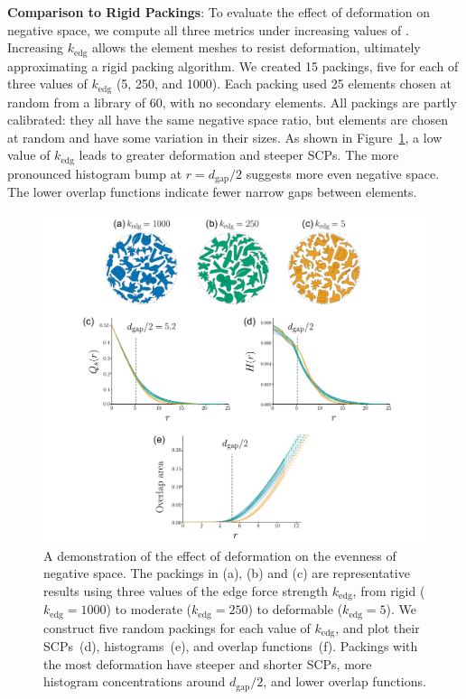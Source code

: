 \textbf{Comparison to Rigid Packings}: 
To evaluate the effect of deformation on negative space, we compute all three metrics under
increasing values of .  
Increasing $k_\mathrm{edg}$
allows the element meshes to resist deformation, ultimately
approximating a rigid packing algorithm.  We created 15 packings,
five for each of three values of $k_\mathrm{edg}$ (5, 250, and 1000).  Each packing
used 25 elements chosen at random from a library of 60, with
no secondary elements.  
All packings are partly calibrated: they all have the same negative
space ratio, but elements are chosen at random and have some
variation in their sizes.
As shown in Figure~\ref{fifteen_packings}, a low value of
$k_\mathrm{edg}$ leads to greater deformation and steeper SCPs.
The more pronounced histogram bump at $r=d_\mathrm{gap}/2$ suggests
more even negative space.
The lower overlap functions indicate fewer narrow gaps between elements.

\begin{figure}
\centering
\includegraphics[width=1.0\textwidth]{figures/metrics/evaluation_big.pdf}
\caption[A demonstration of the effect of deformation \newline on the evenness of negative space]
{\label{fifteen_packings}
A demonstration of the effect of deformation on the evenness of negative space.  
The packings in (a), (b) and (c) are representative results using three values of the edge force strength $k_\mathrm{edg}$,
from rigid ($k_\mathrm{edg}=1000$) to moderate ($k_\mathrm{edg}=250$) to deformable ($k_\mathrm{edg}=5$).
We construct five random packings for each value of $k_\mathrm{edg}$, and plot their SCPs~(d), histograms~(e), and overlap functions~(f).
Packings with the most deformation have steeper and shorter SCPs, 
more histogram concentrations around $d_\mathrm{gap} / 2$, and lower overlap functions.
}
\end{figure}



